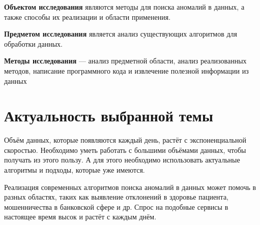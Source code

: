 \textbf{Объектом исследования} являются методы для поиска аномалий в данных, а также способы их реализации и области применения.

\textbf{Предметом исследования} является анализ существующих алгоритмов для обработки данных.

\textbf{Методы исследования} — анализ предметной области, анализ реализованных методов, написание программного кода и извлечение полезной информации из данных

\clearpage

\section{Актуальность выбранной темы} \label{sec:ch1/sec3}

Объём данных, которые появляются каждый день, растёт с экспоненциальной скоростью. Необходимо уметь работать с большими объёмами данных, чтобы получать из этого пользу. А для этого необходимо использовать актуальные алгоритмы и подходы, которые уже имеются.

Реализация современных алгоритмов поиска аномалий в данных может помочь в разных областях, таких как выявление отклонений в здоровье пациента, мошенничества в банковской сфере и др. Спрос на подобные сервисы в настоящее время высок и растёт с каждым днём.

\clearpage